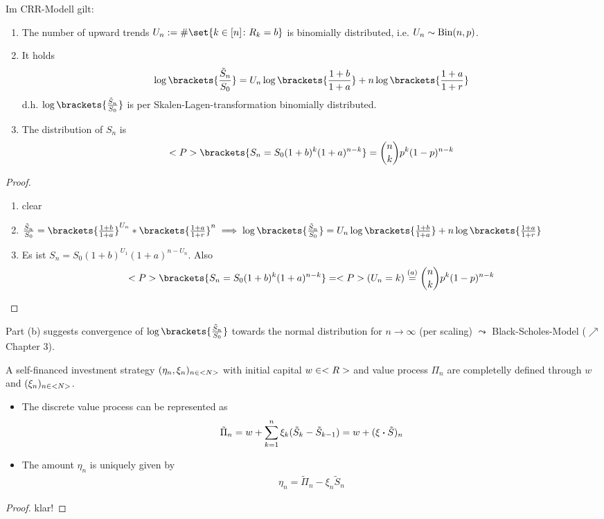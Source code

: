 \begin{proposition} %
	Im CRR-Modell gilt:
	\begin{enumerate}
		\item The number of upward trends $U_n := \# \set{k \in [n] \colon R_k = b}$ is binomially distributed, i.e. $U_n \sim \operatorname{Bin}(n,p)$.
		\item It holds
		\begin{align*}
		\log\brackets{\frac{\tilde{S}_n}{S_0}} = U_n \log\brackets{\frac{1+b}{1+a}} + n \log\brackets{\frac{1+a}{1+r}}
		\end{align*}
		d.h. $\log\brackets{\frac{\tilde{S}_n}{S_0}}$ is per Skalen-Lagen-transformation binomially distributed. 
		\item The distribution of $S_n$ is
		\begin{align*}
		\P\brackets{S_n = S_0 (1+b)^k (1+a)^{n-k}} = \binom{n}{k} p^k (1-p)^{n-k}
		\end{align*} 
	\end{enumerate}
\end{proposition}
\begin{proof}
	\begin{enumerate}
		\item clear
		\item $\frac{\tilde{S}_n}{S_0} = \brackets{\frac{1+b}{1+a}}^{U_n} * \brackets{\frac{1+a}{1+r}}^n \implies \log\brackets{\frac{\tilde{S}_n}{S_0}} = U_n \log\brackets{\frac{1+b}{1+a}} + n \log\brackets{\frac{1+a}{1+r}}$
		\item Es ist $S_n = S_0 (1+b)^{U_1}(1+a)^{n-U_n} $. Also
		\begin{align*}
		\P\brackets{S_n = S_0 (1+b)^k (1+a)^{n-k}} = \P(U_n = k) \overset{(a)}{=} \binom{n}{k} p^k (1-p)^{n-k}
		\end{align*}
	\end{enumerate}
\end{proof}
\begin{*remark}
	Part (b) suggests convergence of $\log\brackets{\frac{\tilde{S}_n}{S_0}}$ towards the normal distribution for $n \to \infty$ (per scaling) 
	$\leadsto$ Black-Scholes-Model ($\nearrow$ Chapter 3).
\end{*remark}
\begin{lemma} %
	A self-financed investment strategy $(\eta_n,\xi_n)_{n\in <N>}$ with initial capital $w \in <R>$ and value process $\Pi_n$ are completelly defined through $w$ and $(\xi_n)_{n \in <N>}$.
	\begin{itemize}
		\item The discrete value process can be represented as
		\begin{align*}
		\tilde{\Pi}_n = w + \sum_{k=1}^n \xi_k (\tilde{S}_k - \tilde{S}_{k-1}) = w + (\xi \boldsymbol{\cdot} \tilde{S})_n
		\end{align*}
		\item The amount $\eta_n$ is uniquely given by 
		\begin{align*}
			\eta_n = \tilde{\Pi}_n - \xi_n \tilde{S}_n
		\end{align*}
	\end{itemize}
\end{lemma}
\begin{proof}
	klar!
\end{proof}
